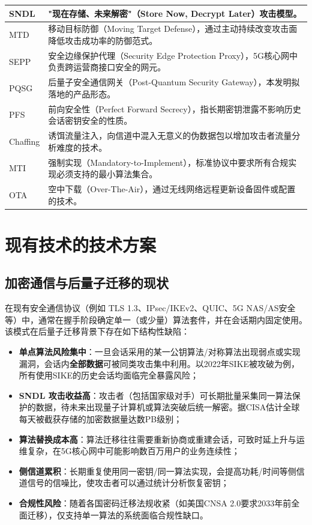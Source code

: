 ﻿\documentclass[12pt,a4paper]{article}
\begin{document}
\begin{longtable}{|p{3.2cm}|p{12.0cm}|}
\hline
SNDL & "现在存储、未来解密"（Store Now, Decrypt Later）攻击模型。\\
\hline
MTD & 移动目标防御（Moving Target Defense），通过主动持续改变攻击面降低攻击成功率的防御范式。\\
\hline
SEPP & 安全边缘保护代理（Security Edge Protection Proxy），5G核心网中负责跨运营商接口安全的网元。\\
\hline
PQSG & 后量子安全通信网关（Post-Quantum Security Gateway），本发明拟落地的产品形态。\\
\hline
PFS & 前向安全性（Perfect Forward Secrecy），指长期密钥泄露不影响历史会话密钥安全的性质。\\
\hline
Chaffing & 诱饵流量注入，向信道中混入无意义的伪数据包以增加攻击者流量分析难度的技术。\\
\hline
MTI & 强制实现（Mandatory-to-Implement），标准协议中要求所有合规实现必须支持的最小算法集合。\\
\hline
OTA & 空中下载（Over-The-Air），通过无线网络远程更新设备固件或配置的技术。\\
\hline
\end{longtable}

\section{现有技术的技术方案}

\subsection{加密通信与后量子迁移的现状}

在现有安全通信协议（例如 TLS 1.3、IPsec/IKEv2、QUIC、5G NAS/AS安全等）中，通常在握手阶段确定单一（或少量）算法套件，并在会话期内固定使用。该模式在后量子迁移背景下存在如下结构性缺陷：

\begin{itemize}
    \item \textbf{单点算法风险集中}：一旦会话采用的某一公钥算法/对称算法出现弱点或实现漏洞，会话内\textbf{全部数据}可被同类攻击集中利用。以2022年SIKE被攻破为例，所有使用SIKE的历史会话均面临完全暴露风险；
    \item \textbf{SNDL 攻击收益高}：攻击者（包括国家级对手）可长期批量采集同一算法保护的数据，待未来出现量子计算机或算法突破后统一解密。据CISA估计全球每天被截获存储的加密数据量达数PB级别；
    \item \textbf{算法替换成本高}：算法迁移往往需要重新协商或重建会话，可致时延上升与运维复杂，在5G核心网中可能影响数百万用户的业务连续性；
    \item \textbf{侧信道累积}：长期重复使用同一密钥/同一算法实现，会提高功耗/时间等侧信道信号的信噪比，使攻击者可以通过统计分析恢复密钥；
    \item \textbf{合规性风险}：随着各国密码迁移法规收紧（如美国CNSA 2.0要求2033年前全面迁移），仅支持单一算法的系统面临合规性缺口。
\end{itemize}
\end{document}
